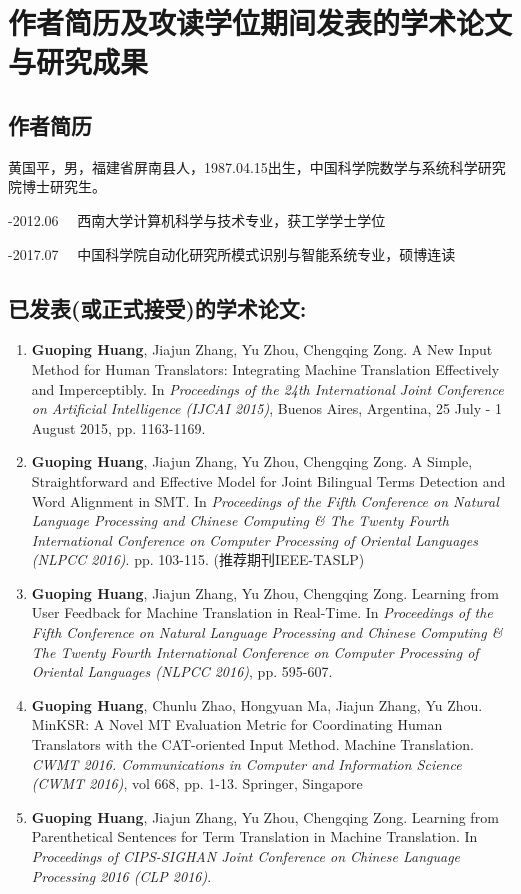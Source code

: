 \chapter{作者简历及攻读学位期间发表的学术论文与研究成果}

\section*{作者简历}

\noindent 黄国平，男，福建省屏南县人，1987.04.15出生，中国科学院数学与系统科学研究院博士研究生。

-2012.06 \ \ 西南大学计算机科学与技术专业，获工学学士学位

-2017.07 \ \ 中国科学院自动化研究所模式识别与智能系统专业，硕博连读

\section*{已发表(或正式接受)的学术论文:}

\begin{enumerate}[(1)]
	\item \textbf{Guoping Huang}, Jiajun Zhang, Yu Zhou, Chengqing Zong. A New Input Method for Human Translators: Integrating Machine Translation Effectively and Imperceptibly. In \textit{Proceedings of the 24th International Joint Conference on Artificial Intelligence (IJCAI 2015)}, Buenos Aires, Argentina, 25 July - 1 August 2015, pp. 1163-1169.

	\item \textbf{Guoping Huang}, Jiajun Zhang, Yu Zhou, Chengqing Zong. A Simple, Straightforward and Effective Model for Joint Bilingual Terms Detection and Word Alignment in SMT. In \textit{Proceedings of the Fifth Conference on Natural Language Processing and Chinese Computing \& The Twenty Fourth International Conference on Computer Processing of Oriental Languages (NLPCC 2016)}. pp. 103-115. (推荐期刊IEEE-TASLP)

	\item \textbf{Guoping Huang}, Jiajun Zhang, Yu Zhou, Chengqing Zong. Learning from User Feedback for Machine Translation in Real-Time. In \textit{Proceedings of the Fifth Conference on Natural Language Processing and Chinese Computing \& The Twenty Fourth International Conference on Computer Processing of Oriental Languages (NLPCC 2016)}, pp. 595-607.

	\item \textbf{Guoping Huang}, Chunlu Zhao, Hongyuan Ma, Jiajun Zhang, Yu Zhou. MinKSR: A Novel MT Evaluation Metric for Coordinating Human Translators with the CAT-oriented Input Method. Machine Translation. \textit{CWMT 2016. Communications in Computer and Information Science (CWMT 2016)}, vol 668, pp. 1-13. Springer, Singapore

	\item \textbf{Guoping Huang}, Jiajun Zhang, Yu Zhou, Chengqing Zong. Learning from Parenthetical Sentences for Term Translation in Machine Translation. In \textit{Proceedings of CIPS-SIGHAN Joint Conference on Chinese Language Processing 2016 (CLP 2016)}.
\end{enumerate}

